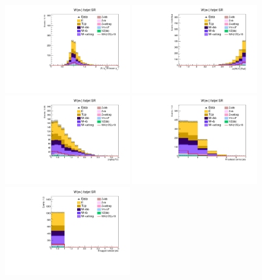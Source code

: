 \begin{figure}[tbp]
  \begin{center}
    \includegraphics[width=0.48\textwidth]{figures/wlnhbb2016/boosted/WenWHFJSR_fj1WPtBalance.pdf}
    \includegraphics[width=0.48\textwidth]{figures/wlnhbb2016/boosted/WenWHFJSR_deltaPhiVH.pdf}
    \includegraphics[width=0.48\textwidth]{figures/wlnhbb2016/boosted/WenWHFJSR_dEtal1fj1.pdf}
    \includegraphics[width=0.48\textwidth]{figures/wlnhbb2016/boosted/WenWHFJSR_nIsojet.pdf}
    \includegraphics[width=0.48\textwidth]{figures/wlnhbb2016/boosted/WenWHFJSR_isojetNBtags.pdf}

\end{center}
\end{figure}
